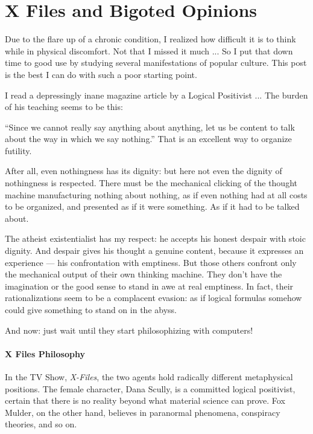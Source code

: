 \section{X Files and Bigoted Opinions}

Due to the flare up of a chronic condition, I realized how difficult it is to think while in physical discomfort. Not that I missed it much ... So I put that down time to good use by studying several manifestations of popular culture. This post is the best I can do with such a poor starting point.

\begin{quotationx}
I read a depressingly inane magazine article by a Logical Positivist ... The burden of his teaching seems to be this:

``Since we cannot really say anything about anything, let us be content to talk about the way in which we say nothing.'' That is an excellent way to organize futility.

After all, even nothingness has its dignity: but here not even the dignity of nothingness is respected. There must be the mechanical clicking of the thought machine manufacturing nothing about nothing, as if even nothing had at all costs to be organized, and presented as if it were something. As if it had to be talked about.

The atheist existentialist has my respect: he accepts his honest despair with stoic dignity. And despair gives his thought a genuine content, because it expresses an experience --- his confrontation with emptiness. But those others confront only the mechanical output of their own thinking machine. They don't have the imagination or the good sense to stand in awe at real emptiness. In fact, their rationalizations seem to be a complacent evasion: as if logical formulas somehow could give something to stand on in the abyss.

And now: just wait until they start philosophizing with computers!
\end{quotationx}


\paragraph{X Files Philosophy}


In the TV Show, \emph{X-Files}, the two agents hold radically different metaphysical positions. The female character, Dana Scully, is a committed logical positivist, certain that there is no reality beyond what material science can prove. Fox Mulder, on the other hand, believes in paranormal phenomena, conspiracy theories, and so on.

